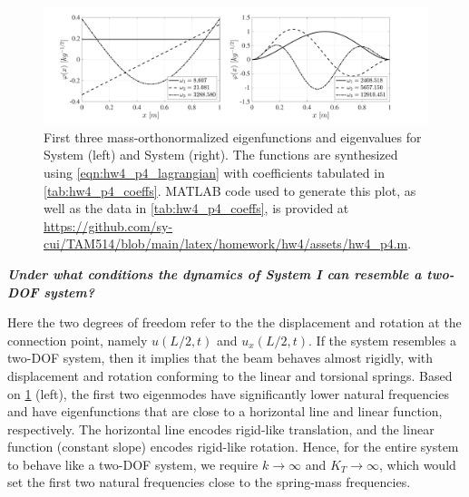\begin{figure}[!ht]
    \centering
    \includegraphics[width=\textwidth]{homework/hw4/assets/hw4_p4_efunc.pdf}
    \caption{
        First three mass-orthonormalized eigenfunctions and eigenvalues for System  (left) and System  (right). 
        The functions are synthesized using \cref{eqn:hw4_p4_lagrangian} with coefficients tabulated in \cref{tab:hw4_p4_coeffs}. 
        MATLAB code used to generate this plot, as well as the data in \cref{tab:hw4_p4_coeffs}, is provided at \url{https://github.com/sy-cui/TAM514/blob/main/latex/homework/hw4/assets/hw4_p4.m}.
    }\label{fig:hw4_p4_efunc}
\end{figure}

\noindent\textbf{\emph{Under what conditions
the dynamics of System I can resemble a two-DOF system?}}

Here the two degrees of freedom refer to the the displacement and rotation at the connection point, namely $u(L/2, t)$ and $u_x(L/2, t)$. 
If the system resembles a two-DOF system, then it implies that the beam behaves almost rigidly, with displacement and rotation conforming to the linear and torsional springs. 
Based on \cref{fig:hw4_p4_efunc} (left), the first two eigenmodes have significantly lower natural frequencies and have eigenfunctions that are close to a horizontal line and linear function, respectively.
The horizontal line encodes rigid-like translation, and the linear function (constant slope) encodes rigid-like rotation.
Hence, for the entire system to behave like a two-DOF system, we require $k \rightarrow \infty$ and $K_T \rightarrow \infty$, which would set the first two natural frequencies close to the spring-mass frequencies. 